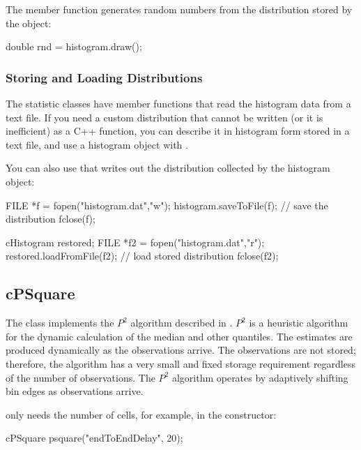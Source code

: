The  member function generates random
numbers from the distribution stored by the
object:

\begin{cpp}
double rnd = histogram.draw();
\end{cpp}


\subsubsection{Storing and Loading Distributions}
\label{sec:sim-lib:storing-and-loading-distributions}

The statistic classes have  member functions
that read the histogram data from a text file. If you need a custom
distribution that cannot be written (or it
is inefficient) as a C++ function, you can describe it in histogram form
stored in a text file, and use a histogram object with
.

You can also use  that writes out the distribution
collected by the histogram object:

\begin{cpp}
FILE *f = fopen("histogram.dat","w");
histogram.saveToFile(f); // save the distribution
fclose(f);

cHistogram restored;
FILE *f2 = fopen("histogram.dat","r");
restored.loadFromFile(f2); // load stored distribution
fclose(f2);
\end{cpp}


\subsection{cPSquare}
\label{sec:sim-lib:psquare}

The  class implements the $P^{2}$ algorithm
described in \cite{JCh85}. $P^{2}$ is a heuristic algorithm
for the dynamic calculation of the median and other quantiles.
The estimates are produced dynamically as the observations arrive.
The observations are not stored; therefore, the algorithm has
a very small and fixed storage requirement regardless of
the number of observations. The $P^{2}$ algorithm operates
by adaptively shifting bin edges as observations arrive.

 only needs the number of cells, for example,
in the constructor:

\begin{cpp}
cPSquare psquare("endToEndDelay", 20);
\end{cpp}

